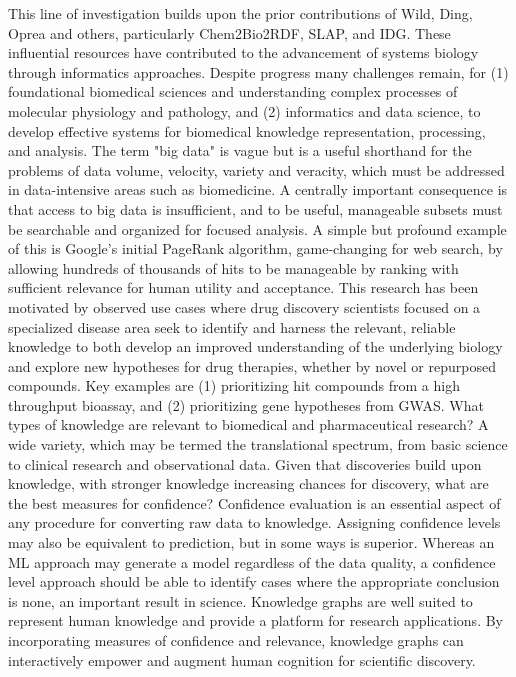 This line of investigation builds upon the prior contributions of Wild, Ding, Oprea and others, particularly Chem2Bio2RDF\cite{Chen2010-to}, SLAP\cite{Chen2012-iq}, and IDG\cite{Oprea2018-cp}. These influential resources have contributed to the advancement of systems biology through informatics approaches.  Despite progress many challenges remain, for (1) foundational biomedical sciences and understanding complex processes of molecular physiology and pathology, and (2) informatics and data science, to develop effective systems for biomedical knowledge representation, processing, and analysis.  The term "big data" is vague but is a useful shorthand for the problems of data volume, velocity, variety and veracity, which must be addressed in data-intensive areas such as biomedicine.  A centrally important consequence is that access to big data is insufficient, and to be useful, manageable subsets must be searchable and organized for focused analysis.  A simple but profound example of this is Google's initial PageRank algorithm, game-changing for web search, by allowing hundreds of thousands of hits to be manageable by ranking with sufficient relevance for human utility and acceptance.  This research has been motivated by observed use cases where drug discovery scientists focused on a specialized disease area seek to identify and harness the relevant, reliable knowledge to both develop an improved understanding of the underlying biology and explore new hypotheses for drug therapies, whether by novel or repurposed compounds. Key examples are (1) prioritizing hit compounds from a high throughput bioassay, and (2) prioritizing gene hypotheses from GWAS.
What types of knowledge are relevant to biomedical and pharmaceutical research?  A wide variety, which may be termed the translational spectrum, from basic science to clinical research and observational data. Given that discoveries build upon knowledge, with stronger knowledge increasing chances for discovery, what are the best measures for confidence?  Confidence evaluation is an essential aspect of any procedure for converting raw data to knowledge.  Assigning confidence levels may also be equivalent to prediction, but in some ways is superior.  Whereas an ML approach may generate a model regardless of the data quality, a confidence level approach should be able to identify cases where the appropriate conclusion is none, an important result in science. Knowledge graphs are well suited to represent human knowledge and provide a platform for research applications. By incorporating measures of confidence and relevance, knowledge graphs can interactively empower and augment human cognition for scientific discovery.


